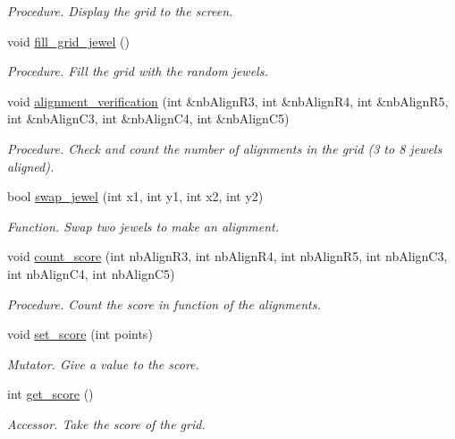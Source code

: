 \begin{DoxyCompactItemize}
\begin{DoxyCompactList}\small\item\em Procedure. Display the grid to the screen. \end{DoxyCompactList}\item 
void \hyperlink{classGrid_a33f8649c54b789906328f9aabd7f8081}{fill\+\_\+grid\+\_\+jewel} ()\hypertarget{classGrid_a33f8649c54b789906328f9aabd7f8081}{}\label{classGrid_a33f8649c54b789906328f9aabd7f8081}

\begin{DoxyCompactList}\small\item\em Procedure. Fill the grid with the random jewels. \end{DoxyCompactList}\item 
void \hyperlink{classGrid_adea72fa7e2e2f012932f02881e305494}{alignment\+\_\+verification} (int \&nb\+Align\+R3, int \&nb\+Align\+R4, int \&nb\+Align\+R5, int \&nb\+Align\+C3, int \&nb\+Align\+C4, int \&nb\+Align\+C5)
\begin{DoxyCompactList}\small\item\em Procedure. Check and count the number of alignments in the grid (3 to 8 jewels aligned). \end{DoxyCompactList}\item 
bool \hyperlink{classGrid_a745f847f89d5bff5a95b453a2b518351}{swap\+\_\+jewel} (int x1, int y1, int x2, int y2)
\begin{DoxyCompactList}\small\item\em Function. Swap two jewels to make an alignment. \end{DoxyCompactList}\item 
void \hyperlink{classGrid_a2f90f70fac7091c5ee3c8d3c78709611}{count\+\_\+score} (int nb\+Align\+R3, int nb\+Align\+R4, int nb\+Align\+R5, int nb\+Align\+C3, int nb\+Align\+C4, int nb\+Align\+C5)
\begin{DoxyCompactList}\small\item\em Procedure. Count the score in function of the alignments. \end{DoxyCompactList}\item 
void \hyperlink{classGrid_a431072be83d45cc180416ed78d5eee73}{set\+\_\+score} (int points)
\begin{DoxyCompactList}\small\item\em Mutator. Give a value to the score. \end{DoxyCompactList}\item 
int \hyperlink{classGrid_a02344c40c13b6a311b4bab0dfd66942f}{get\+\_\+score} ()
\begin{DoxyCompactList}\small\item\em Accessor. Take the score of the grid. \end{DoxyCompactList}\end{DoxyCompactItemize}



